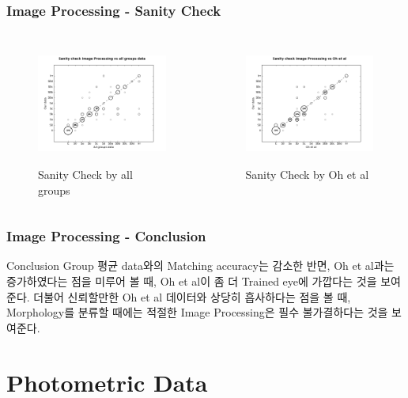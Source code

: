 \documentclass[xcolor={dvipsnames,table}]{beamer}
\newcommand\NM{\fontsize{9}{7.2}\selectfont}
\begin{document}
\begin{frame}
 \frametitle{Image Processing - Sanity Check}
 
 \begin{columns}[t]
   \begin{figure}
    \centering
    \includegraphics[width=6cm, height=4cm]{SanityIM_allgroup.png}
    \caption{Sanity Check by all groups}
   \end{figure}
   \begin{figure}
    \centering
    \includegraphics[width=6cm, height=4cm]{SanityIM_oh.png}
    \caption{Sanity Check by Oh et al}
   \end{figure}
  \end{columns}

\end{frame}

\begin{frame}
  \frametitle{Image Processing - Conclusion}
  \NM
  \begin{block}{Conclusion}
   \hspace{0.5cm}Group 평균 data와의 Matching accuracy는 감소한 반면, Oh et al과는 증가하였다는 점을 미루어 볼 때, Oh et al이 좀 더
   Trained eye에 가깝다는 것을 보여준다. \hspace{0.1cm}더불어 신뢰할만한 Oh et al 데이터와 상당히 흡사하다는 점을 볼 때,
   Morphology를 분류할 때에는 적절한 Image Processing은 필수 불가결하다는 것을 보여준다.
  \end{block}




\end{frame}
\endgroup

\section{Photometric Data}
\end{document}
